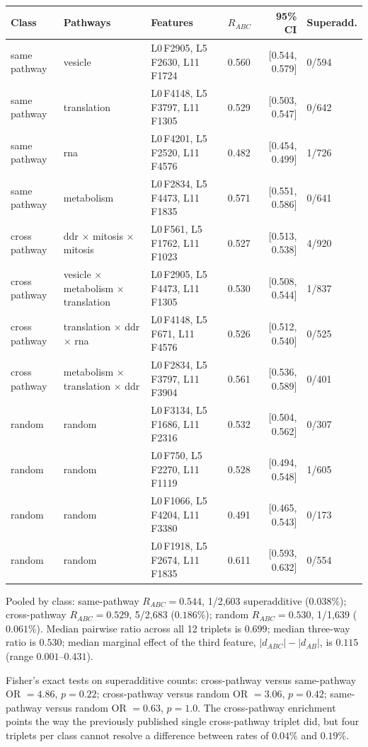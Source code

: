 \documentclass[10pt,letterpaper]{article}
\begin{document}
\begin{center}
\small
\begin{tabular}{llllrl}
\toprule
Class & Pathways & Features & $R_{ABC}$ & 95\% CI & Superadd. \\
\midrule
same pathway & vesicle & L0\,F2905, L5\,F2630, L11\,F1724 & 0.560 & [0.544, 0.579] & 0/594 \\
same pathway & translation & L0\,F4148, L5\,F3797, L11\,F1305 & 0.529 & [0.503, 0.547] & 0/642 \\
same pathway & rna & L0\,F4201, L5\,F2520, L11\,F4576 & 0.482 & [0.454, 0.499] & 1/726 \\
same pathway & metabolism & L0\,F2834, L5\,F4473, L11\,F1835 & 0.571 & [0.551, 0.586] & 0/641 \\
cross pathway & ddr $\times$ mitosis $\times$ mitosis & L0\,F561, L5\,F1762, L11\,F1023 & 0.527 & [0.513, 0.538] & 4/920 \\
cross pathway & vesicle $\times$ metabolism $\times$ translation & L0\,F2905, L5\,F4473, L11\,F1305 & 0.530 & [0.508, 0.544] & 1/837 \\
cross pathway & translation $\times$ ddr $\times$ rna & L0\,F4148, L5\,F671, L11\,F4576 & 0.526 & [0.512, 0.540] & 0/525 \\
cross pathway & metabolism $\times$ translation $\times$ ddr & L0\,F2834, L5\,F3797, L11\,F3904 & 0.561 & [0.536, 0.589] & 0/401 \\
random & random & L0\,F3134, L5\,F1686, L11\,F2316 & 0.532 & [0.504, 0.562] & 0/307 \\
random & random & L0\,F750, L5\,F2270, L11\,F1119 & 0.528 & [0.494, 0.548] & 1/605 \\
random & random & L0\,F1066, L5\,F4204, L11\,F3380 & 0.491 & [0.465, 0.543] & 0/173 \\
random & random & L0\,F1918, L5\,F2674, L11\,F1835 & 0.611 & [0.593, 0.632] & 0/554 \\
\bottomrule
\end{tabular}
\end{center}

Pooled by class: same-pathway $R_{ABC}=0.544$, 1/2{,}603 superadditive ($0.038\%$); cross-pathway $R_{ABC}=0.529$, 5/2{,}683 ($0.186\%$); random $R_{ABC}=0.530$, 1/1{,}639 ($0.061\%$). Median pairwise ratio across all 12 triplets is $0.699$; median three-way ratio is $0.530$; median marginal effect of the third feature, $|d_{ABC}|-|d_{AB}|$, is $0.115$ (range $0.001$--$0.431$).

Fisher's exact tests on superadditive counts: cross-pathway versus same-pathway OR $=4.86$, $p=0.22$; cross-pathway versus random OR $=3.06$, $p=0.42$; same-pathway versus random OR $=0.63$, $p=1.0$. The cross-pathway enrichment points the way the previously published single cross-pathway triplet did, but four triplets per class cannot resolve a difference between rates of $0.04\%$ and $0.19\%$.
\end{document}
